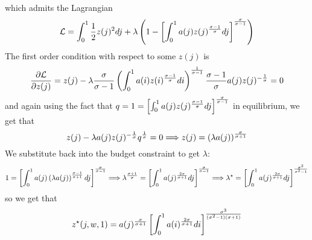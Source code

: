 \documentclass[12pt]{article}
\begin{document}
\begin{enumerate}
\begin{enumerate}
\[		\]
		which admits the Lagrangian
		\[
		\mathcal{L} = \int_0^1 \frac{1}{2}z(j)^2 dj + \lambda \left( 1 - \left[ \int_0^1 a(j) z(j)^\frac{\sigma-1}{\sigma} dj \right]^\frac{\sigma}{\sigma-1}\right)
		\]
		The first order condition with respect to some $z(j)$ is
		\[
		\frac{\partial \mathcal{L}}{\partial z(j)} = z(j) - \lambda \frac{\sigma}{\sigma - 1} \left( \int_0^1 a(i) z(i)^\frac{\sigma - 1}{\sigma}di \right)^\frac{1}{\sigma - 1} \frac{\sigma - 1}{\sigma} a(j) z(j)^{-\frac{1}{\sigma}} = 0
		\]
		and again using the fact that $q = 1 = \left[ \int_0^1 a(j) z(j)^\frac{\sigma-1}{\sigma} dj \right]^\frac{\sigma}{\sigma-1}$ in equilibrium, we get that
		\[
		z(j) - \lambda a(j)z(j)^{-\frac{1}{\sigma}} q^\frac{1}{\sigma} = 0 \Longrightarrow z(j) = \left( \lambda a(j)\right)^{\frac{\sigma}{\sigma + 1}}
		\]
		We substitute back into the budget constraint to get $\lambda$:
		\[
		1 = \left[ \int_0^1 a(j) \left( \lambda a(j) \right)^\frac{\sigma-1}{\sigma+1} dj \right]^\frac{\sigma}{\sigma-1} \Longrightarrow \lambda^\frac{\sigma + 1}{\sigma} = \left[ \int_0^1 a(j)^{\frac{2\sigma}{\sigma + 1}}dj\right]^\frac{\sigma}{\sigma -1} \Longrightarrow \lambda^\star = \left[ \int_0^1 a(j)^{\frac{2\sigma}{\sigma + 1}}dj\right]^\frac{\sigma^2}{\sigma^2 -1}
		\]
		so we get that
		\[
		z^\star(j,w,1) = a(j)^\frac{\sigma}{\sigma+1} \left[ \int_0^1 a(i)^{\frac{2\sigma}{\sigma + 1}}di\right]^\frac{\sigma^3}{(\sigma^2 -1)(\sigma+1)}
		\]
	\end{enumerate}
	

\end{enumerate}
\end{document}
